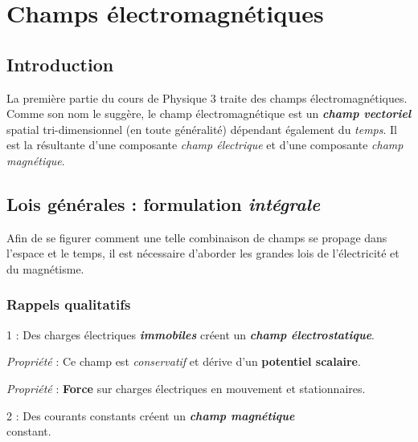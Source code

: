 
\chapter{Champs électromagnétiques} 

 
\section{Introduction}

La première partie du cours de Physique 3 traite des champs électromagnétiques. \\
Comme son nom le suggère, le champ électromagnétique est un \textit{\textbf{champ vectoriel}} spatial
tri-dimensionnel (en toute généralité) dépendant également du \textit{temps}.  Il est la résultante d'une composante \textit{champ 
électrique} et d'une composante \textit{champ magnétique}. 

\section{Lois générales : formulation \textit{intégrale}}

Afin de se figurer comment une telle combinaison de champs se propage dans l'espace et le temps, il est nécessaire d'aborder les grandes 
lois de l'électricité et du magnétisme. 

\subsection{Rappels qualitatifs}



{\huge 1} : Des charges électriques \textit{\textbf{immobiles}} créent un \textit{\textbf{champ électrostatique}}.

\textit{Propriété} : Ce champ est \textit{conservatif} et dérive d'un \textbf{potentiel scalaire}.

\textit{Propriété} : \textbf{Force} sur charges électriques en mouvement et stationnaires.

{\huge 2} : Des courants constants créent un \textit{\textbf{champ magnétique}} \\constant.


